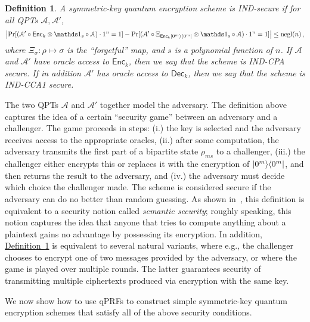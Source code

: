 \documentclass[11pt]{article}
\numberwithin{equation}{section}
\newtheorem{definition}{Definition}
\newcommand{\one}{\mathds 1}
\newcommand{\opn}{\operatorname}
\newcommand{\expref}[2]{\texorpdfstring{\hyperref[#2]{#1~\ref{#2}}}{#1~\ref{#2}}}
\newcommand{\algo}{\mathcal}
\newcommand{\negl}{\opn{negl}}
\newcommand{\Enc}{\ensuremath{\mathsf{Enc}}\xspace}
\newcommand{\Dec}{\ensuremath{\mathsf{Dec}}\xspace}
\newcommand{\prob}{\opn{Pr}}
\begin{document}
{\begin{definition}\label{def:IND}
A symmetric-key quantum encryption scheme is IND-secure if for all QPTs $\algo A, \algo A'$,
$$
\left|\prob[ (\algo A' \circ \Enc_k \otimes \one_s \circ \algo A) \cdot 1^n = 1] -
\prob[ (\algo A' \circ \Xi_{\Enc_k \ket{0^m}\bra{0^m}} \otimes \one_s \circ \algo A) \cdot 1^n = 1] \right|
\leq \negl(n)\,,
$$ 
where $\Xi_\sigma: \rho \mapsto \sigma$ is the ``forgetful'' map, and $s$ is a polynomial function of $n$. If $\algo A$ and $\algo A'$ have oracle access to $\Enc_k$, then we say that the scheme is IND-CPA secure. If in addition $\algo A'$ has oracle access to $\Dec_k$, then we say that the scheme is IND-CCA1 secure.
\end{definition}

The two QPTs $\algo A$ and $\algo A'$ together model the adversary. The definition above captures the idea of a certain ``security game'' between an adversary and a challenger. The game proceeds in steps: (i.) the key is selected and the adversary receives access to the appropriate oracles, (ii.) after some computation, the adversary transmits the first part of a bipartite state $\rho_{ms}$ to a challenger, (iii.) the challenger either encrypts this or replaces it with the encryption of ${\left\vert{0^m}\right\rangle}{\left\langle{0^m}\right\vert}$, and then returns the result to the adversary, and (iv.) the adversary must decide which choice the challenger made. The scheme is considered secure if the adversary can do no better than random guessing. As shown in~\cite{ABFGSS15}, this definition is equivalent to a security notion called \emph{semantic security}; roughly speaking, this notion captures the idea that anyone that tries to compute anything about a plaintext gains no advantage by possessing its encryption. In addition, \expref{Definition}{def:IND} is equivalent to several natural variants, where e.g., the challenger chooses to encrypt one of two messages provided by the adversary, or where the game is played over multiple rounds. The latter guarantees security of transmitting multiple ciphertexts produced via encryption with the same key.

We now show how to use qPRFs to construct simple symmetric-key quantum encryption schemes that satisfy all of the above security conditions.

}
\end{document}
